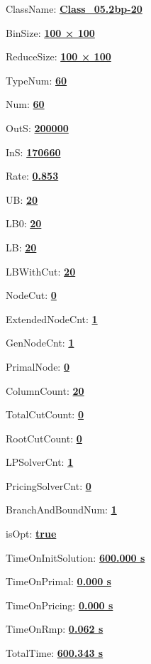 \documentclass[11pt]{article}
\begin{document}
\pagestyle{empty}


ClassName: \underline{\textbf{Class_05.2bp-20}}
\par
BinSize: \underline{\textbf{100 × 100}}
\par
ReduceSize: \underline{\textbf{100 × 100}}
\par
TypeNum: \underline{\textbf{60}}
\par
Num: \underline{\textbf{60}}
\par
OutS: \underline{\textbf{200000}}
\par
InS: \underline{\textbf{170660}}
\par
Rate: \underline{\textbf{0.853}}
\par
UB: \underline{\textbf{20}}
\par
LB0: \underline{\textbf{20}}
\par
LB: \underline{\textbf{20}}
\par
LBWithCut: \underline{\textbf{20}}
\par
NodeCut: \underline{\textbf{0}}
\par
ExtendedNodeCnt: \underline{\textbf{1}}
\par
GenNodeCnt: \underline{\textbf{1}}
\par
PrimalNode: \underline{\textbf{0}}
\par
ColumnCount: \underline{\textbf{20}}
\par
TotalCutCount: \underline{\textbf{0}}
\par
RootCutCount: \underline{\textbf{0}}
\par
LPSolverCnt: \underline{\textbf{1}}
\par
PricingSolverCnt: \underline{\textbf{0}}
\par
BranchAndBoundNum: \underline{\textbf{1}}
\par
isOpt: \underline{\textbf{true}}
\par
TimeOnInitSolution: \underline{\textbf{600.000 s}}
\par
TimeOnPrimal: \underline{\textbf{0.000 s}}
\par
TimeOnPricing: \underline{\textbf{0.000 s}}
\par
TimeOnRmp: \underline{\textbf{0.062 s}}
\par
TotalTime: \underline{\textbf{600.343 s}}
\par
\newpage


\end{document}
